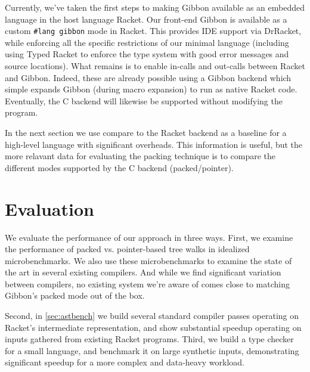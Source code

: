 \documentclass[a4paper,english]{lipics-v2016}
\newcommand{\treelang}{Gibbon\xspace} %
\begin{document}
Currently, we've taken the first steps to making \treelang available as an
embedded language in the host language Racket.
%
Our front-end \treelang is available as a custom \verb|#lang gibbon| mode in
Racket.  This provides IDE support via DrRacket, while enforcing all the
specific restrictions of our minimal language (including using Typed Racket to
enforce the type system with good error messages and source locations).
%
What remains is to enable in-calls and out-calls between Racket and Gibbon.
%
Indeed, these are already possible using a Gibbon backend which simple expands
Gibbon (during macro expansion) to run as native Racket code.  Eventually, the C
backend will likewise be supported without modifying the program.
%

In the next section we use compare to the Racket backend as a baseline for a
high-level language with significant overheads.  This information is useful, but
the more relavant data for evaluating the packing technique is to compare the
different modes supported by the C backend (packed/pointer).


\section{Evaluation}\label{sec:eval}

We evaluate the performance of our approach in three ways. First, we examine the
performance of packed vs. pointer-based tree walks in idealized microbenchmarks.
We also use these microbenchmarks to examine the state of the art in several
existing compilers.  And while we find significant variation between compilers,
no existing system we're aware of comes close to matching \treelang's packed
mode out of the box.


Second, in \cref{sec:astbench} 
we build several standard compiler passes
operating on Racket's intermediate representation, and show
substantial speedup operating on inputs gathered from existing Racket
programs. Third, we build a type checker for a small language, and
benchmark it on large synthetic inputs, demonstrating significant
speedup for a more complex and data-heavy workload. 
\end{document}
